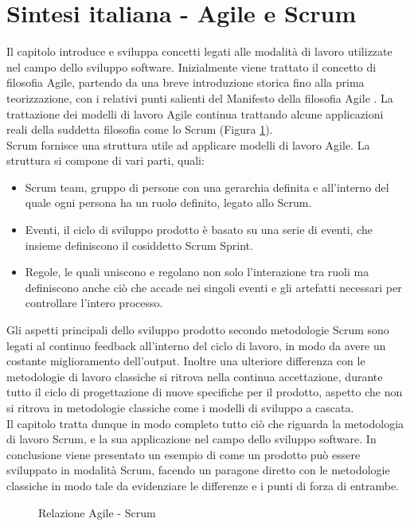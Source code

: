 \documentclass[../main.tex]{subfiles}
\begin{document}
\section{Sintesi italiana - Agile e Scrum}
Il capitolo introduce e sviluppa concetti legati alle modalità di lavoro utilizzate nel campo dello sviluppo software. Inizialmente viene trattato il concetto di filosofia Agile, partendo da una breve introduzione storica fino alla prima teorizzazione, con i relativi punti salienti del Manifesto della filosofia Agile \cite{beck2001agile}. La trattazione dei modelli di lavoro Agile continua trattando alcune applicazioni reali della suddetta filosofia come lo Scrum (Figura \ref{fig:agilesrre}).\\
Scrum fornisce una struttura utile ad applicare modelli di lavoro Agile. La struttura si compone di vari parti, quali:
\begin{itemize}
    \item Scrum team, gruppo di persone con una gerarchia definita e all'interno del quale ogni persona ha un ruolo definito, legato allo Scrum.
    \item Eventi, il ciclo di sviluppo prodotto è basato su una serie di eventi, che insieme definiscono il cosiddetto Scrum Sprint.
    \item Regole, le quali uniscono e regolano non solo l'interazione tra ruoli ma definiscono anche ciò che accade nei singoli eventi e gli artefatti necessari per controllare l'intero processo.
\end{itemize}
Gli aspetti principali dello sviluppo prodotto secondo metodologie Scrum sono legati al continuo feedback all'interno del ciclo di lavoro, in modo da avere un costante miglioramento dell'output. Inoltre una ulteriore differenza con le metodologie di lavoro classiche si ritrova nella continua accettazione, durante tutto il ciclo di progettazione di nuove specifiche per il prodotto, aspetto che non si ritrova in metodologie classiche come i modelli di sviluppo a cascata.\\
Il capitolo tratta dunque in modo completo tutto ciò che riguarda la metodologia di lavoro Scrum, e la sua applicazione nel campo dello sviluppo software. In conclusione viene presentato un esempio di come un prodotto può essere sviluppato in modalità Scrum, facendo un paragone diretto con le metodologie classiche in modo tale da evidenziare le differenze e i punti di forza di entrambe.
\begin{figure}
    \centering
{} 
    \caption{Relazione Agile - Scrum}
    \label{fig:agilesrre}
\end{figure}
\cleardoublepage
\end{document}
